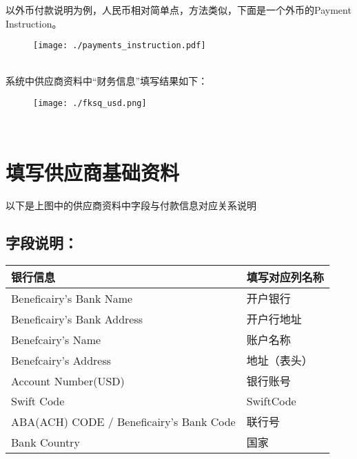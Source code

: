 \documentclass[zihao=-4]{ctexart}
\begin{document}
以外币付款说明为例，人民币相对简单点，方法类似，下面是一个外币的Payment Instruction。\\
\begin{figure}[!h]
	\centering
	\texttt{[image: ./payments\_instruction.pdf]}
\end{figure}\\
系统中供应商资料中“财务信息”填写结果如下：\\
\begin{figure}[!h]
	\centering
	\texttt{[image: ./fksq\_usd.png]}
\end{figure}\\
\hypertarget{ux4f9bux5e94ux5546ux57faux7840ux8d44ux6599}{%
\section{填写供应商基础资料}\label{ux4f9bux5e94ux5546ux57faux7840ux8d44ux6599}}
以下是上图中的供应商资料中字段与付款信息对应关系说明\\
\hypertarget{ux586bux5199ux8bf4ux660e-2}{%
\subsection{字段说明：}\label{ux586bux5199ux8bf4ux660e-2}}

\begin{longtable}[]{@{}ll@{}}	
\toprule
\textbf{银行信息} & \textbf{填写对应列名称} \\
\midrule
\endhead
Beneficairy's Bank Name & 开户银行 \\
Beneficairy's Bank Address & 开户行地址 \\
Benefcairy's Name & 账户名称 \\
Benefcairy's Address & 地址（表头） \\
Account Number(USD) & 银行账号 \\
Swift Code & SwiftCode \\	
ABA(ACH) CODE / Beneficairy's Bank Code & 联行号 \\
Bank Country & 国家 \\
\bottomrule
\end{longtable}
\end{document}
